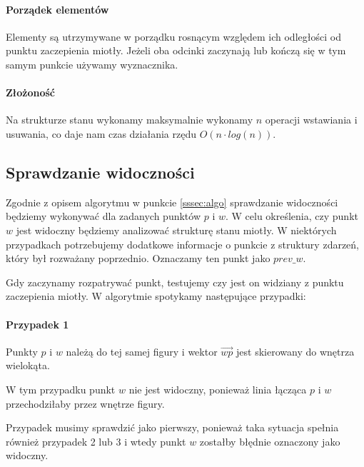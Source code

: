 \documentclass[12pt]{article}
\begin{document}
			\paragraph{Porządek elementów}
				Elementy są utrzymywane w porządku rosnącym względem ich odległości od punktu zaczepienia miotły. Jeżeli oba odcinki zaczynają lub kończą się w tym samym punkcie używamy wyznacznika.
				
			\paragraph{Złożoność}
				Na strukturze stanu wykonamy maksymalnie wykonamy $ n $ operacji wstawiania i usuwania, co daje nam czas działania rzędu $ O(n \cdot log(n)) $.
		
		\pagebreak
		\subsection{Sprawdzanie widoczności}
			
			Zgodnie z opisem algorytmu w punkcie \ref{sssec:algo} sprawdzanie widoczności będziemy wykonywać dla zadanych punktów $ p $ i $ w $. W celu określenia, czy punkt $ w $ jest widoczny będziemy analizować strukturę stanu miotły. W niektórych przypadkach potrzebujemy dodatkowe informacje o punkcie z struktury zdarzeń, który był rozważany poprzednio. Oznaczamy ten punkt jako $ prev\_w $.
			
			\vspace{\baselineskip} %
			Gdy zaczynamy rozpatrywać punkt, testujemy czy jest on widziany z punktu zaczepienia miotły.  W algorytmie spotykamy następujące przypadki:
			
			\paragraph{Przypadek 1}
			Punkty $ p $ i $ w $ należą do tej samej figury i wektor $ \overrightarrow{wp} $ jest skierowany do wnętrza wielokąta.
			
			
			\vspace{\baselineskip} %
			W tym przypadku punkt $ w $ nie jest widoczny, ponieważ linia łącząca $ p $ i $ w $ przechodziłaby przez wnętrze figury.
			
			\vspace{\baselineskip} %
			Przypadek musimy sprawdzić jako pierwszy, ponieważ taka sytuacja spełnia również przypadek 2 lub 3 i wtedy punkt $ w $ zostałby błędnie oznaczony jako widoczny.
			
\end{document}

